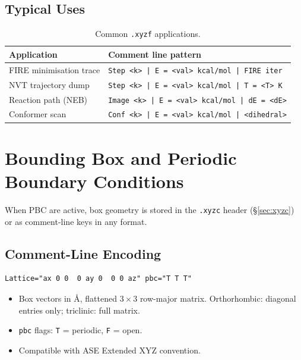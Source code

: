\documentclass[12pt, a4paper, oneside]{article}
\begin{document}
\subsection{Typical Uses}

\begin{table}[htbp]
  \centering
  \caption{Common \texttt{.xyzf} applications.}
  \label{tab:xyzf_uses}
  \begin{tabular}{lp{8cm}}
    \toprule
    Application & Comment line pattern \\
    \midrule
    FIRE minimisation trace  & \texttt{Step <k> | E = <val> kcal/mol | FIRE iter} \\
    NVT trajectory dump      & \texttt{Step <k> | E = <val> kcal/mol | T = <T> K} \\
    Reaction path (NEB)      & \texttt{Image <k> | E = <val> kcal/mol | dE = <dE>} \\
    Conformer scan           & \texttt{Conf <k> | E = <val> kcal/mol | <dihedral>} \\
    \bottomrule
  \end{tabular}
\end{table}

\section{Bounding Box and Periodic Boundary Conditions}
\label{sec:pbc}

When PBC are active, box geometry is stored in the \texttt{.xyzc} header
(\S\ref{sec:xyzc}) or as comment-line keys in any format.

\subsection{Comment-Line Encoding}

\begin{lstlisting}[language={},frame=single]
Lattice="ax 0 0  0 ay 0  0 0 az" pbc="T T T"
\end{lstlisting}

\begin{itemize}
  \item Box vectors in \AA, flattened $3\times 3$ row-major matrix.
        Orthorhombic: diagonal entries only; triclinic: full matrix.
  \item \texttt{pbc} flags: \texttt{T} = periodic, \texttt{F} = open.
  \item Compatible with ASE Extended XYZ convention.
\end{itemize}
\end{document}
